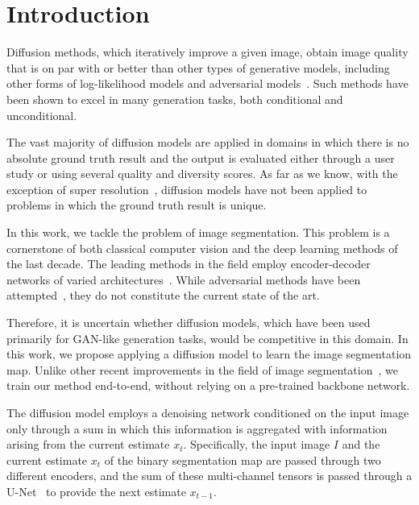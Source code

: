 \documentclass[10pt,twocolumn,letterpaper]{article}
\begin{document}
\section{Introduction}
\label{sec:intro}

Diffusion methods, which iteratively improve a given image, obtain image quality that is on par with or better than other types of generative models, including other forms of log-likelihood models and adversarial models~\cite{dhariwal2021diffusion,ho2022cascaded}. Such methods have been shown to excel in many generation tasks, both conditional and unconditional.

The vast majority of diffusion models are applied in domains in which there is no absolute ground truth result and the output is evaluated either through a user study or using several quality and diversity scores. As far as we know, with the exception of super resolution~\cite{ho2022cascaded,saharia2021image,li2022srdiff}, diffusion models have not been applied to problems in which the ground truth result is unique.

In this work, we tackle the problem of image segmentation. This problem is a cornerstone of both classical computer vision and the deep learning methods of the last decade. The leading methods in the field employ encoder-decoder networks of varied architectures~\cite{long2015fully,ronneberger2015u,xie2021segformer,zhou2018unet++,chao2019hardnet,yu2015multi}. While adversarial methods have been attempted~\cite{luc2016semantic,xie2017adversarial,xue2018segan,fischer2017adversarial}, they do not constitute the current state of the art.

Therefore, it is uncertain whether diffusion models, which have been used primarily for GAN-like generation tasks, would be competitive in this domain. In this work, we propose applying a diffusion model to learn the image segmentation map. Unlike other recent improvements in the field of image segmentation~\cite{strudel2021segmenter,fu2020scene,huang2019ccnet}, we train our method end-to-end, without relying on a pre-trained backbone network.

The diffusion model employs a denoising network conditioned on the input image only through a sum in which this information is aggregated with information arising from the current estimate $x_t$. Specifically, the input image $I$ and the current estimate $x_t$ of the binary segmentation map are passed through two different encoders, and the sum of these multi-channel tensors is passed through a U-Net~\cite{ronneberger2015u} to provide the next estimate $x_{t-1}$.
\end{document}
